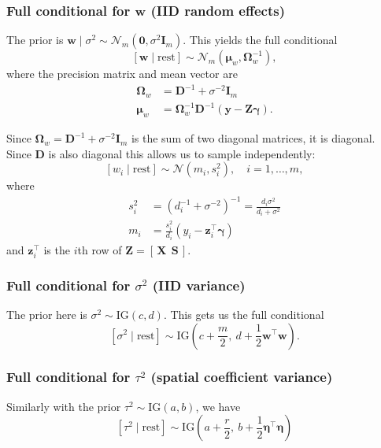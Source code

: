 \documentclass[12pt]{article}
\begin{document}
\subsubsection*{Full conditional for $\mathbf{w}$ (IID random effects)}

The prior is $\mathbf{w} \mid \sigma^2 \sim \mathcal{N}_m(\mathbf{0}, \sigma^2 \mathbf{I}_m)$.  This yields the full conditional 
\[
[\mathbf{w} \mid \text{rest}]
\sim \mathcal{N}_m(\boldsymbol{\mu}_w, \boldsymbol{\Omega}_w^{-1}),
\]
where the precision matrix and mean vector are 
\begin{align}
\boldsymbol{\Omega}_w &= \mathbf{D}^{-1} + \sigma^{-2} \mathbf{I}_m \label{eq:omega_w}\\
\boldsymbol{\mu}_w &= \boldsymbol{\Omega}_w^{-1} \mathbf{D}^{-1} (\mathbf{y} - \mathbf{Z}\boldsymbol{\gamma}) \label{eq:mu_w}.
\end{align}

Since $\boldsymbol{\Omega}_w = \mathbf{D}^{-1} + \sigma^{-2} \mathbf{I}_m$ is the sum of two diagonal matrices, it is diagonal. Since $\mathbf{D}$ is also diagonal this allows us to sample independently:
\[
[w_i \mid \text{rest}] \sim
\mathcal{N}\left( m_i, s_i^2 \right), \quad i=1,\ldots,m,
\]
where
\begin{align}
s_i^2 &= \left( d_i^{-1} + \sigma^{-2} \right)^{-1}
      = \frac{d_i \sigma^2}{d_i + \sigma^2} \label{eq:var_w}\\
m_i &= \frac{s_i^2}{d_i} (y_i - \mathbf{z}_i^\top \boldsymbol{\gamma}) \label{eq:mean_w}
\end{align}
and $\mathbf{z}_i^\top$ is the $i$th row of $\mathbf{Z} = [\,\mathbf{X} \ \ \mathbf{S}\,]$.

\subsubsection*{Full conditional for $\sigma^2$ (IID variance)}

The prior here is $\sigma^2 \sim \text{IG}(c, d)$.  This gets us the full conditional \[
[\sigma^2 \mid \text{rest}]
\sim \text{IG}\left( c + \frac{m}{2}, \ d + \frac{1}{2} \mathbf{w}^\top \mathbf{w} \right) \label{eq:sigma_sq}.
\]

\subsubsection*{Full conditional for $\tau^2$ (spatial coefficient variance)}

Similarly with the prior $\tau^2 \sim \text{IG}(a, b)$, we have 
\[
[\tau^2 \mid \text{rest}]
\sim \text{IG}\left( a + \frac{r}{2}, \ b + \frac{1}{2} \boldsymbol{\eta}^\top \boldsymbol{\eta} \right) \label{eq:tau_sq}
\]
\end{document}
